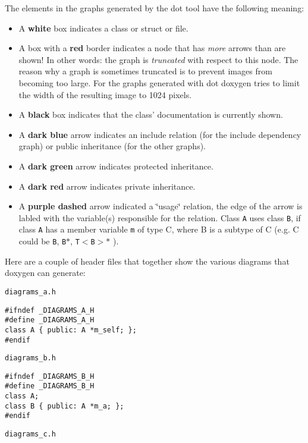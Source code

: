 The elements in the graphs generated by the dot tool have the following meaning: \begin{itemize}
\item A {\bf white} box indicates a class or struct or file. \item A box with a {\bf red} border indicates a node that has {\em more\/} arrows than are shown! In other words: the graph is {\em truncated\/} with respect to this node. The reason why a graph is sometimes truncated is to prevent images from becoming too large. For the graphs generated with dot doxygen tries to limit the width of the resulting image to 1024 pixels. \item A {\bf black} box indicates that the class' documentation is currently shown. \item A {\bf dark blue} arrow indicates an include relation (for the include dependency graph) or public inheritance (for the other graphs). \item A {\bf dark green} arrow indicates protected inheritance. \item A {\bf dark red} arrow indicates private inheritance. \item A {\bf purple dashed} arrow indicated a \char`\"{}usage\char`\"{} relation, the edge of the arrow is labled with the variable(s) responsible for the relation. Class {\tt A} uses class {\tt B}, if class {\tt A} has a member variable {\tt m} of type C, where B is a subtype of C (e.g. C could be {\tt B}, {\tt B$\ast$}, {\tt T$<$B$>$$\ast$} ). \end{itemize}


Here are a couple of header files that together show the various diagrams that doxygen can generate:

{\tt diagrams\_\-a.h} 

\begin{VerbInclude}\begin{verbatim}#ifndef _DIAGRAMS_A_H
#define _DIAGRAMS_A_H
class A { public: A *m_self; };
#endif
\end{verbatim}
\end{VerbInclude}
 {\tt diagrams\_\-b.h} 

\begin{VerbInclude}\begin{verbatim}#ifndef _DIAGRAMS_B_H
#define _DIAGRAMS_B_H
class A;
class B { public: A *m_a; };
#endif
\end{verbatim}
\end{VerbInclude}
 {\tt diagrams\_\-c.h} 

